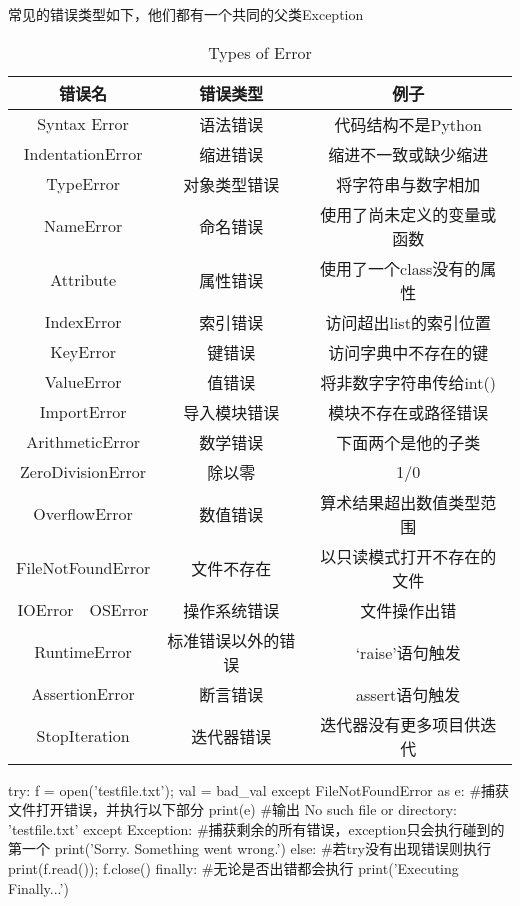     常见的错误类型如下，他们都有一个共同的父类Exception
    \begin{table}[htb]
      \centering  
      \caption{Types of Error}
      \label{tab: types of error}
      \begin{tabular}{ccc}
        \toprule[1.5pt]
        错误名 & 错误类型 & 例子 \\
        \midrule
        Syntax Error & 语法错误 & 代码结构不是Python \\
        IndentationError & 缩进错误 & 缩进不一致或缺少缩进 \\
        TypeError & 对象类型错误 & 将字符串与数字相加 \\
        NameError & 命名错误 & 使用了尚未定义的变量或函数 \\
        Attribute & 属性错误 & 使用了一个class没有的属性 \\
        IndexError & 索引错误 & 访问超出list的索引位置 \\
        KeyError & 键错误 & 访问字典中不存在的键 \\
        ValueError & 值错误 & 将非数字字符串传给int() \\
        ImportError & 导入模块错误 & 模块不存在或路径错误 \\
        ArithmeticError & 数学错误 & 下面两个是他的子类 \\
        ZeroDivisionError & 除以零 & 1/0 \\
        OverflowError & 数值错误 & 算术结果超出数值类型范围 \\
        FileNotFoundError & 文件不存在 & 以只读模式打开不存在的文件 \\
        IOError~~OSError & 操作系统错误 & 文件操作出错 \\
        RuntimeError & 标准错误以外的错误 & `raise'语句触发 \\
        AssertionError & 断言错误 & assert语句触发 \\
        StopIteration & 迭代器错误 & 迭代器没有更多项目供迭代 \\
        \bottomrule[1.5pt]
      \end{tabular}
    \end{table}

    \begin{codeblock}[language=python, caption={try except}]
      try:
          f = open('testfile.txt'); val = bad_val
      except FileNotFoundError as e: #捕获文件打开错误，并执行以下部分
          print(e) #输出 No such file or directory: 'testfile.txt'
      except Exception: #捕获剩余的所有错误，exception只会执行碰到的第一个
          print('Sorry. Something went wrong.')
      else: #若try没有出现错误则执行
          print(f.read()); f.close()
      finally: #无论是否出错都会执行
          print('Executing Finally...')
    \end{codeblock}


